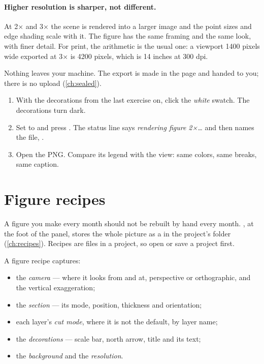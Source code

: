 \paragraph{Higher resolution is sharper, not different.} At 2× and 3× the scene is rendered into a larger image and the point sizes and edge shading scale with it. The figure has the same framing and the same look, with finer detail. For print, the arithmetic is the usual one: a viewport 1400 pixels wide exported at 3× is 4200 pixels, which is 14 inches at 300 dpi.

Nothing leaves your machine. The export is made in the page and handed to you; there is no upload (\cref{ch:sealed}).

\begin{tryit}
\begin{enumerate}
\item With the decorations from the last exercise on, click the \emph{white} swatch. The decorations turn dark.
\item Set  to  and press . The status line says \emph{rendering figure 2×…} and then names the file, .
\item Open the PNG. Compare its legend with the view: same colors, same breaks, same caption.
\end{enumerate}
\end{tryit}


\section{Figure recipes}\label{sec:figures-recipes}

A figure you make every month should not be rebuilt by hand every month. , at the foot of the panel, stores the whole picture as a  in the project's  folder (\cref{ch:recipes}). Recipes are files in a project, so open or save a project first.

A figure recipe captures:

\begin{itemize}
\item the \emph{camera} — where it looks from and at, perspective or orthographic, and the vertical exaggeration;
\item the \emph{section} — its mode, position, thickness and orientation;
\item each layer's \emph{cut mode}, where it is not the default, by layer name;
\item the \emph{decorations} — scale bar, north arrow, title and its text;
\item the \emph{background} and the \emph{resolution}.
\end{itemize}

